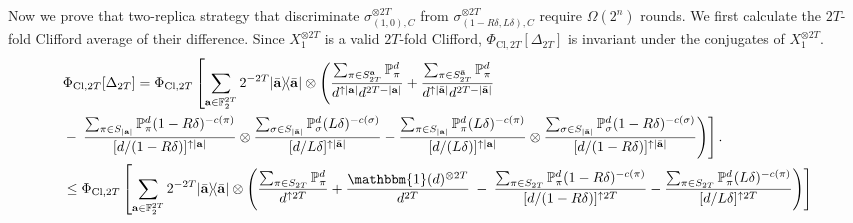 \documentclass[aps,%
twocolumn,%
floatfix,%
pra,%
amsfonts,%
groupedaddress,%
superscriptaddress]{revtex4-2}%
\newcommand{\bra}[1]{\langle #1\rvert}
\newcommand{\ket}[1]{\lvert #1\rangle}
\newcommand{\1}{\mathbbm{1}}
\begin{document}
Now we prove that two-replica strategy that discriminate $\sigma_{(1,0),C}^{\otimes 2T}$ from $\sigma_{(1 - R\delta,L\delta),C}^{\otimes 2T} $ require $\Omega(2^{n})$ rounds. We first calculate the $2T$-fold Clifford average of their difference. Since $X_1^{\otimes 2T} $ is a valid  $2T$-fold Clifford, $\Phi_{\mathrm{Cl},2T}[\Delta_{2T}]$ is invariant under the conjugates of $X_1^{\otimes 2T} $. 
\begin{align}
    &\Phi_{\mathrm{Cl},2T}[\Delta_{2T}] = \Phi_{\mathrm{Cl},2T}\left[\sum_{\mathbf{a} \in \mathbb{F}_2^{2T}} {2^{-2T}\ket{\bar{\mathbf{a}}}\!\bra{\bar{\mathbf{a}}}} \otimes \left( \frac{\sum_{\pi \in S_{2T}^{\mathbf{a}}} \mathbb{P}_{\pi}^{d}}{d^{\uparrow |\mathbf{a}|} d^{2T - |\mathbf{a}|}} + \frac{\sum_{\pi \in S_{2T}^{\bar{\mathbf{a}}}} \mathbb{P}_{\pi}^{d}}{d^{\uparrow |\bar{\mathbf{a}}|} d^{2T - |\bar{\mathbf{a}}|}} \right. \right.\\
   &-\left.\left.\frac{\sum_{\pi \in S_{|\mathbf{a}|}} \mathbb{P}_{\pi }^{d} (1 - R \delta)^{-c(\pi)}}{[d/(1 - R\delta)]^{\uparrow |\mathbf{a}|} } \otimes \frac{ \sum_{\sigma \in S_{|\bar{\mathbf{a}}|}} \mathbb{P}_{ \sigma}^{d}(L\delta)^{-c(\sigma)}}{[d/L\delta]^{\uparrow |\bar{\mathbf{a}}|}} -\frac{\sum_{\pi \in S_{|\mathbf{a}|}} \mathbb{P}_{\pi }^{d} (L \delta)^{-c(\pi)}}{[d/(L\delta)]^{\uparrow |\mathbf{a}|} } \otimes \frac{ \sum_{\sigma \in S_{|\bar{\mathbf{a}}|}} \mathbb{P}_{ \sigma}^{d}(1 - R\delta)^{-c(\sigma)}}{[d/(1 - R\delta)]^{\uparrow |\bar{\mathbf{a}}|}} 
   \right)\right].\\
    &\leq \Phi_{\mathrm{Cl},2T}\left[\sum_{\mathbf{a} \in \mathbb{F}_2^{2T}} {2^{-2T}\ket{\bar{\mathbf{a}}}\!\bra{\bar{\mathbf{a}}}} \otimes \left( \frac{\sum_{\pi \in S_{2T}} \mathbb{P}_{\pi}^{d}}{d^{\uparrow 2T} } + \frac{\1(d)^{\otimes 2T}}{ d^{2T}} \right. \right.-\left.\left.\frac{\sum_{\pi \in S_{2T}} \mathbb{P}_{\pi}^{d} (1 - R \delta)^{-c(\pi)} }{[d/(1 - R\delta)]^{\uparrow 2T} }   - 
   \frac{\sum_{\pi \in S_{2T}} \mathbb{P}_{\pi }^{d}  (L\delta)^{-c(\pi)}}{[d/L\delta]^{\uparrow 2T}}\right)\right]
\end{align}
\end{document}
